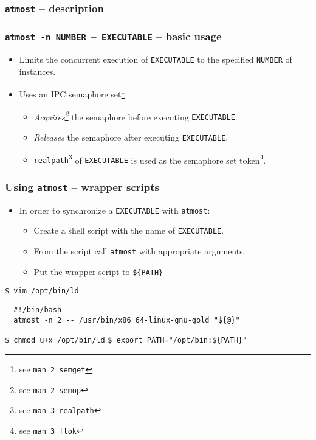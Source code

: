 \documentclass[compress,table,xcolor=table]{beamer}
\newcommand{\shelltext}[1]{\texttt{\colorbox{light-gray}{#1}}}
\begin{document}
\begin{frame}
  \frametitle{\shelltext{atmost} -- description}
  \Large
\end{frame}
\begin{frame}
  \frametitle{\shelltext{atmost -n NUMBER -- EXECUTABLE} -- basic usage}
  \begin{itemize}
    \Large
    \item Limits the concurrent execution of \shelltext{EXECUTABLE} to the specified \shelltext{NUMBER} of instances.
    \item Uses an IPC semaphore set\footnote{see \shelltext{man 2 semget}}.
    \begin{itemize}
      \large 
      \item {\em Acquires\footnote{see \shelltext{man 2 semop}}} the semaphore before executing \shelltext{EXECUTABLE}.
      \item {\em Releases} the semaphore after executing \shelltext{EXECUTABLE}.
      \item \shelltext{realpath}\footnote{see \shelltext{man 3 realpath}} of \shelltext{EXECUTABLE} is used as the semaphore set token\footnote{see \shelltext{man 3 ftok}}.
    \end{itemize}
  \end{itemize}
\end{frame}
\begin{frame}[fragile]
  \frametitle{Using \shelltext{atmost} -- wrapper scripts}
  \begin{itemize}
    \large
    \item In order to synchronize a \shelltext{EXECUTABLE} with \shelltext{atmost}:
    \begin{itemize}
      \item Create a shell script with the name of \shelltext{EXECUTABLE}.
      \item From the script call \shelltext{atmost} with appropriate arguments.
      \item Put the wrapper script to \shelltext{\$\{PATH\}}
    \end{itemize}
  \end{itemize}
  \shelltext{\$ vim /opt/bin/ld}
  \begin{verbatim}
  #!/bin/bash
  atmost -n 2 -- /usr/bin/x86_64-linux-gnu-gold "${@}"
  \end{verbatim}
  \shelltext{\$ chmod u+x /opt/bin/ld}
  \shelltext{\$ export PATH="/opt/bin:\$\{PATH\}"}\\
\end{frame}
\end{document}
